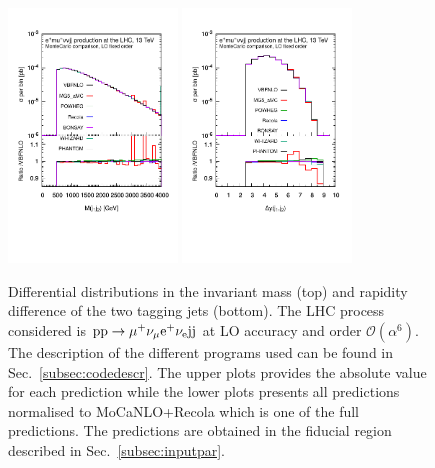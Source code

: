  \begin{figure}[htb!]
   \centering
   \includegraphics[width=0.4\textwidth,angle=0,clip=true,trim={0.4cm 2cm 0.cm 1.cm}]{figures/LO/mjj_LO.pdf}
   \includegraphics[width=0.4\textwidth,angle=0,clip=true,trim={0.4cm 2cm 0.cm 1.cm}]{figures/LO/dyj1j2_LO.pdf}
\caption{\label{fig:wg1_mjj-llLO} Differential distributions in the invariant mass (top) and rapidity difference of the two tagging jets (bottom).
The LHC process considered is ${\rm p}{\rm p}\to\mu^+\nu_\mu{\rm e}^+\nu_{\rm e}{\rm j}{\rm j}$ at LO accuracy and order $\mathcal{O}(\alpha^6)$.
The description of the different programs used can be found in Sec.~\ref{subsec:codedescr}.
The upper plots provides the absolute value for each prediction while the lower plots presents all predictions normalised to {\sc MoCaNLO}+{\sc Recola} which is one of the full predictions.
The predictions are obtained in the fiducial region described in Sec.~\ref{subsec:inputpar}.
}
\end{figure}
